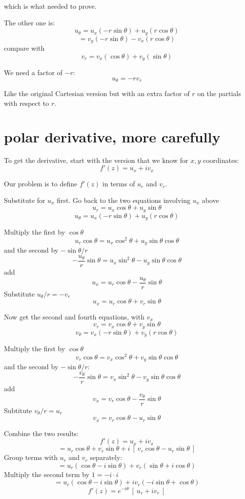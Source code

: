 \documentclass[11pt, oneside]{article}
\begin{document}
which is what needed to prove.

The other one is:
\[ u_{\theta} = u_x (-r \sin \theta) + u_y (r \cos \theta)  \]
\[ = v_y (-r \sin \theta) - v_x (r \cos \theta)  \]
compare with
\[ v_r =  v_x (\cos \theta) + v_y (\sin \theta)  \]

We need a factor of $-r$:
\[ u_{\theta} = -r v_r \]

Like the original Cartesian version but with an extra factor of $r$ on the partials with respect to $r$.

\section*{polar derivative, more carefully}

To get the derivative, start with the version that we know for $x,y$ coordinates:
\[ f'(z) = u_x + i v_x \]

Our problem is to define $f'(z)$ in terms of $u_r$ and $v_r$.

Substitute for $u_x$ first.  Go back to the two equations involving $u_x$ above
\[ u_r = u_x \cos \theta + u_y \sin \theta \]
\[ u_{\theta} = u_x (-r \sin \theta) + u_y (r \cos \theta) \]

Multiply the first by $\cos \theta$
\[ u_r \cos \theta = u_x \cos^2 \theta + u_y \sin \theta \cos \theta \]
 and the second by $- \sin \theta/r$
\[ - \frac{u_{\theta}}{r} \sin \theta = u_x  \sin^2 \theta - u_y \sin \theta \cos \theta \]
add
\[ u_x = u_r \cos \theta - \frac{u_{\theta}}{r} \sin \theta \]
Substitute $u_{\theta}/r = - v_r$
\[ u_x = u_r \cos \theta + v_r \sin \theta \]

Now get the second and fourth equations, with $v_x$
\[ v_r = v_x \cos \theta + v_y \sin \theta \]
\[ v_{\theta} = v_x (-r \sin \theta) + v_y (r \cos \theta) \]

Multiply the first by $\cos \theta$
\[ v_r \cos \theta = v_x \cos^2 \theta + v_y \sin \theta \cos \theta \]
and the second by $-\sin \theta / r$:
\[ -\frac{v_{\theta}}{r} \sin \theta = v_x \sin^2 \theta - v_y \sin \theta \cos \theta \]
add
\[ v_x = v_r \cos \theta -\frac{v_{\theta}}{r} \sin \theta \]
Subtitute $v_{\theta}/r = u_r$
\[ v_x = v_r \cos \theta - u_r \sin \theta \]

Combine the two results:
\[ f'(z) = u_x + i v_x \]
\[ = u_r \cos \theta + v_r \sin \theta + i \ [ \ v_r \cos \theta - u_r \sin \theta \ ] \]
Group terms with $u_r$ and $v_r$ separately:
\[ = u_r (\cos \theta - i \sin \theta) + v_r (\sin \theta + i \cos \theta)  \]
Multiply the second term by $1 = - i \cdot i$
\[ = u_r (\cos \theta - i \sin \theta) + i v_r (- i \sin \theta + \cos \theta)  \]
\[ f'(z) = e^{-i \theta} \ [ \ u_r + i v_r \ ] \]
\end{document}
